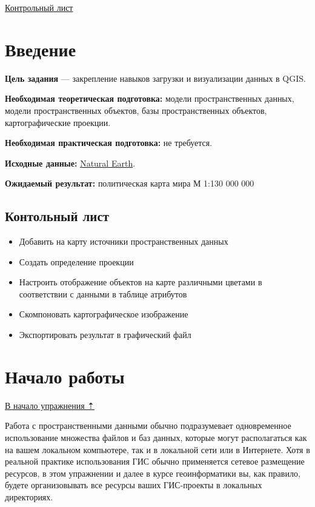 \documentclass[
  12pt,
]{book}
\providecommand{\tightlist}{%
  \setlength{\itemsep}{0pt}\setlength{\parskip}{0pt}}
\begin{document}
\href{https://github.com/aentin/qgis-course/raw/master/files/Ex02_\%D0\%BE\%D1\%82\%D1\%87\%D1\%91\%D1\%82.docx}{Контрольный лист}

\hypertarget{map-design-world-intro}{%
\section{Введение}\label{map-design-world-intro}}

\textbf{Цель задания} --- закрепление навыков загрузки и визуализации данных в QGIS.

\textbf{Необходимая теоретическая подготовка:} модели пространственных данных, модели пространственных объектов, базы пространственных объектов, картографические проекции.

\textbf{Необходимая практическая подготовка:} не требуется.

\textbf{Исходные данные:} \href{https://www.naturalearthdata.com/}{Natural Earth}.

\textbf{Ожидаемый результат:} политическая карта мира М 1:130 000 000

\hypertarget{map-design-world-checklist}{%
\subsection{Контольный лист}\label{map-design-world-checklist}}

\begin{itemize}
\tightlist
\item
  Добавить на карту источники пространственных данных
\item
  Создать определение проекции
\item
  Настроить отображение объектов на карте различными цветами в соответствии с данными в таблице атрибутов
\item
  Скомпоновать картографическое изображение
\item
  Экспортировать результат в графический файл
\end{itemize}

\hypertarget{map-design-world-begin}{%
\section{Начало работы}\label{map-design-world-begin}}

\protect\hyperlink{map-design-world}{В начало упражнения ⇡}

Работа с пространственными данными обычно подразумевает одновременное использование множества файлов и баз данных, которые могут располагаться как на вашем локальном компьютере, так и в локальной сети или в Интернете. Хотя в реальной практике использования ГИС обычно применяется сетевое размещение ресурсов, в этом упражнении и далее в курсе геоинформатики вы, как правило, будете организовывать все ресурсы ваших ГИС-проекты в локальных директориях.
\end{document}
